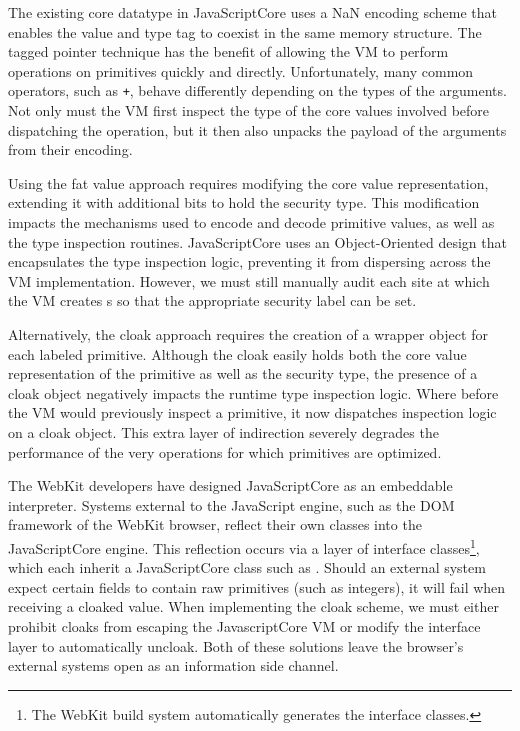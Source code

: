 The existing core datatype in JavaScriptCore uses a NaN encoding scheme that enables the value and type tag to coexist in the same memory structure.
The tagged pointer technique has the benefit of allowing the VM to perform operations on primitives quickly and directly.
Unfortunately, many common operators, such as \texttt{+}, behave differently depending on the types of the arguments.
Not only must the VM first inspect the type of the core values involved before dispatching the operation, but it then also unpacks the payload of the arguments from their encoding.

Using the fat value approach requires modifying the core value representation, extending it with additional bits to hold the security type.
This modification impacts the mechanisms used to encode and decode primitive values, as well as the type inspection routines.
JavaScriptCore uses an Object-Oriented design that encapsulates the type inspection logic, preventing it from dispersing across the VM implementation.
However, we must still manually audit each site at which the VM creates s so that the appropriate security label can be set.

Alternatively, the cloak approach requires the creation of a wrapper object for each labeled primitive.
Although the cloak easily holds both the core value representation of the primitive as well as the security type, the presence of a cloak object negatively impacts the runtime type inspection logic.
Where before the VM would previously inspect a primitive, it now dispatches inspection logic on a cloak object.
This extra layer of indirection severely degrades the performance of the very operations for which primitives are optimized.

The WebKit developers have designed JavaScriptCore as an embeddable interpreter.
Systems external to the JavaScript engine, such as the DOM framework of the WebKit browser, reflect their own classes into the JavaScriptCore engine.
This reflection occurs via a layer of interface classes\footnote{The WebKit build system automatically generates the interface classes.}, which each inherit a JavaScriptCore class such as .
Should an external system expect certain fields to contain raw primitives (such as integers), it will fail when receiving a cloaked value.
When implementing the cloak scheme, we must either prohibit cloaks from escaping the JavascriptCore VM or modify the interface layer to automatically uncloak.
Both of these solutions leave the browser's external systems open as an information side channel.

